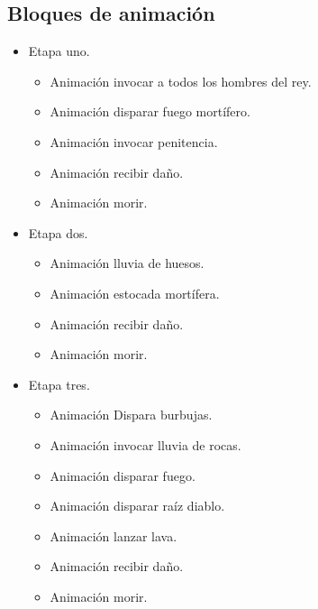 \subsection{Bloques de animación}     
	\begin{itemize}
		\item Etapa uno.
			\begin{itemize}
				\item Animación invocar a todos los hombres del rey.
				\item Animación disparar fuego mortífero.
				\item Animación invocar penitencia.
				\item Animación recibir daño.
				\item Animación morir.
			\end{itemize}
		\item Etapa dos.
			\begin{itemize}
				\item Animación lluvia de huesos.
				\item Animación estocada mortífera.
				\item Animación recibir daño.
				\item Animación morir.
			\end{itemize}
		\item Etapa tres.
			\begin{itemize}
				\item Animación Dispara burbujas.
				\item Animación invocar lluvia de rocas.
				\item Animación disparar fuego.
				\item Animación disparar raíz diablo.
				\item Animación lanzar lava.
				\item Animación recibir daño.
				\item Animación morir.
			\end{itemize}				 
	\end{itemize}